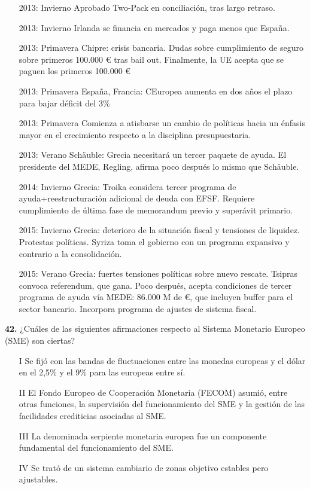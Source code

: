 \documentclass{nuevotema}
\begin{document}
\begin{itemize}
	\item[2013: Invierno] Aprobado Two-Pack en conciliación, tras largo retraso. 
	\item[2013: Invierno] Irlanda se financia en mercados y paga menos que España.
	\item[2013: Primavera] Chipre: crisis bancaria. Dudas sobre cumplimiento de seguro sobre primeros 100.000 € tras bail out. Finalmente, la UE acepta que se paguen los primeros 100.000 €
	\item[2013: Primavera] España, Francia: CEuropea aumenta en dos años el plazo para bajar déficit del 3\% 
	\item[2013: Primavera] Comienza a atisbarse un cambio de políticas hacia un énfasis mayor en el crecimiento respecto a la disciplina presupuestaria.
	\item[2013: Verano] Schäuble: Grecia necesitará un tercer paquete de ayuda. El presidente del MEDE, Regling, afirma poco después lo mismo que Schäuble. 
	\item[2014: Invierno] Grecia: Troika considera tercer programa de ayuda+reestructuración adicional de deuda con EFSF. Requiere cumplimiento de última fase de memorandum previo y superávit primario.
	\item[2015: Invierno] Grecia: deterioro de la situación fiscal y tensiones de liquidez. Protestas políticas. Syriza toma el gobierno con un programa expansivo y contrario a la consolidación.
	\item[2015: Verano] Grecia: fuertes tensiones políticas sobre nuevo rescate. Tsipras convoca referendum, que gana. Poco después, acepta condiciones de tercer programa de ayuda vía MEDE: 86.000 M de €, que incluyen buffer para el sector bancario. Incorpora programa de ajustes de sistema fiscal.
\end{itemize}



\preguntas


\textbf{42.} ¿Cuáles de las siguientes afirmaciones respecto al Sistema Monetario Europeo (SME) son ciertas?

\begin{itemize}
	\item[I] Se fijó con las bandas de fluctuaciones entre las monedas europeas y el dólar en el 2,5\% y el 9\% para las europeas entre sí.
	\item[II] El Fondo Europeo de Cooperación Monetaria (FECOM) asumió, entre otras funciones, la supervisión del funcionamiento del SME y la gestión de las facilidades crediticias asociadas al SME.
	\item[III] La denominada serpiente monetaria europea fue un componente fundamental del funcionamiento del SME.
	\item[IV] Se trató de un sistema cambiario de zonas objetivo estables pero ajustables.
\end{itemize}
\end{document}
